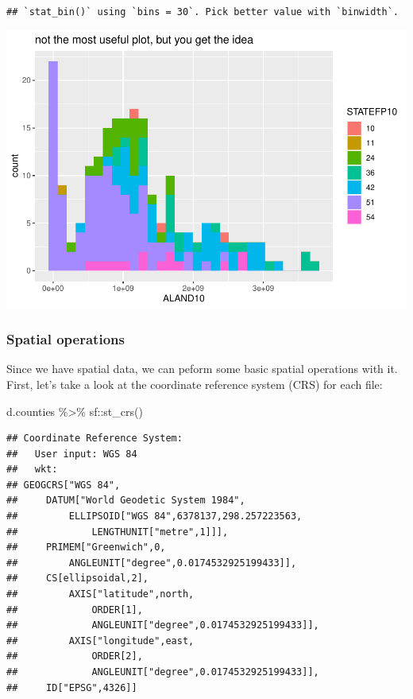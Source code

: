 \documentclass[]{article}
\newenvironment{Shaded}{\begin{snugshade}}{\end{snugshade}}
\newcommand{\FunctionTok}[1]{\textcolor[rgb]{0.00,0.00,0.00}{#1}}
\newcommand{\NormalTok}[1]{#1}
\newcommand{\SpecialCharTok}[1]{\textcolor[rgb]{0.00,0.00,0.00}{#1}}
\begin{document}
\begin{verbatim}
## `stat_bin()` using `bins = 30`. Pick better value with `binwidth`.
\end{verbatim}

\includegraphics{lab01_files/figure-latex/plots2-1.pdf}

\hypertarget{spatial-operations}{%
\subsubsection{Spatial operations}\label{spatial-operations}}

Since we have spatial data, we can peform some basic spatial operations
with it. First, let's take a look at the coordinate reference system
(CRS) for each file:

\begin{Shaded}
\begin{Highlighting}[]
\NormalTok{d.counties }\SpecialCharTok{\%\textgreater{}\%}\NormalTok{ sf}\SpecialCharTok{::}\FunctionTok{st\_crs}\NormalTok{()}
\end{Highlighting}
\end{Shaded}

\begin{verbatim}
## Coordinate Reference System:
##   User input: WGS 84 
##   wkt:
## GEOGCRS["WGS 84",
##     DATUM["World Geodetic System 1984",
##         ELLIPSOID["WGS 84",6378137,298.257223563,
##             LENGTHUNIT["metre",1]]],
##     PRIMEM["Greenwich",0,
##         ANGLEUNIT["degree",0.0174532925199433]],
##     CS[ellipsoidal,2],
##         AXIS["latitude",north,
##             ORDER[1],
##             ANGLEUNIT["degree",0.0174532925199433]],
##         AXIS["longitude",east,
##             ORDER[2],
##             ANGLEUNIT["degree",0.0174532925199433]],
##     ID["EPSG",4326]]
\end{verbatim}
\end{document}
